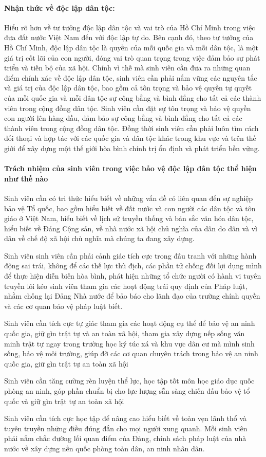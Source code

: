 \paragraph{Nhận thức về độc lập dân tộc:}
Hiểu rõ hơn về tư tưởng độc lập dân tộc và vai trò của Hồ Chí Minh trong việc đưa đất nước Việt Nam đến với độc lập tự do. Bên cạnh đó, theo tư tưởng của Hồ Chí Minh, độc lập dân tộc là quyền của mỗi quốc gia và mỗi dân tộc, là một giá trị cốt lõi của con người, đóng vai trò quan trọng trong việc đảm bảo sự phát triển và tiến bộ của xã hội. Chính vì thế mà sinh viên cần đưa ra những quan điểm chính xác về độc lập dân tộc, sinh viên cần phải nắm vững các nguyên tắc và giá trị của độc lập dân tộc, bao gồm cả tôn trọng và bảo vệ quyền tự quyết của mỗi quốc gia và mỗi dân tộc sự công bằng và bình đẳng cho tất cả các thành viên trong cộng đồng dân tộc. Sinh viên cần đặt sự tôn trọng và bảo vệ quyền con người lên hàng đầu, đảm bảo sự công bằng và bình đẳng cho tất cả các thành viên trong cộng đồng dân tộc. Đồng thời sinh viên cần phải luôn tìm cách đối thoại và hợp tác với các quốc gia và dân tộc khác trong khu vực và trên thế giới để xây dựng một thế giới hòa bình chính trị ổn định và phát triển bền vững.

\paragraph{Trách nhiệm của sinh viên trong việc bảo vệ độc lập dân tộc thể hiện như thế nào}
Sinh viên cần có tri thức hiểu biết về những vấn đề có liên quan đến sự nghiệp bảo vệ Tổ quốc, bao gồm hiểu biết về đất nước và con người các dân tộc và tôn giáo ở Việt Nam, hiểu biết về lịch sử truyền thống và bản sắc văn hóa dân tộc, hiểu biết về Đảng Cộng sản, về nhà nước xã hội chủ nghĩa của dân do dân và vì dân về chế độ xã hội chủ nghĩa mà chúng ta đang xây dựng.

Sinh viên sinh viên cần phải cảnh giác tích cực trong đấu tranh với những hành động sai trái, không để các thế lực thù địch, các phần tử chống đối lợi dụng mình để thực hiện diễn biến hòa bình, phát hiện những tổ chức người có hành vi tuyên truyền lôi kéo sinh viên tham gia các hoạt động trái quy định của Pháp luật, nhằm chống lại Đảng Nhà nước để bảo báo cho lãnh đạo của trường chính quyền và các cơ quan bảo vệ pháp luật biết.

Sinh viên cần tích cực tự giác tham gia các hoạt động cụ thể để bảo vệ an ninh quốc gia, giữ gìn trật tự và an toàn xã hội, tham gia xây dựng nếp sống văn minh trật tự ngay trong trường học ký túc xá và khu vực dân cư mà mình sinh sống, bảo vệ môi trường, giúp đỡ các cơ quan chuyên trách trong bảo vệ an ninh quốc gia, giữ gìn trật tự an toàn xã hội

Sinh viên cần tăng cường rèn luyện thể lực, học tập tốt môn học giáo dục quốc phòng an ninh, góp phần chuẩn bị cho lực lượng sẵn sàng chiến đấu bảo vệ tổ quốc và giữ gìn trật tự an toàn xã hội

Sinh viên cần tích cực học tập để nâng cao hiểu biết về toàn vẹn lãnh thổ và tuyên truyền những điều đúng đắn cho mọi người xung quanh. Mỗi sinh viên phải nắm chắc đường lối quan điểm của Đảng, chính sách pháp luật của nhà nước về xây dựng nền quốc phòng toàn dân, an ninh nhân dân.
\cleardoublepage